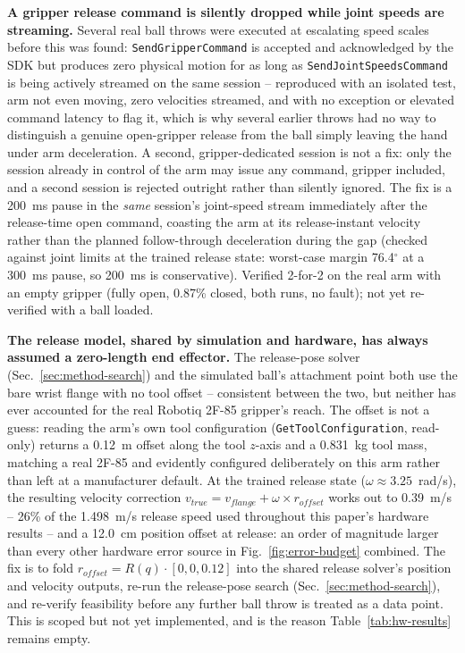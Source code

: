 \documentclass[conference]{IEEEtran}
\begin{document}
\textbf{A gripper release command is silently dropped while joint speeds
are streaming.} Several real ball throws were executed at escalating speed
scales before this was found: \texttt{SendGripperCommand} is accepted and
acknowledged by the SDK but produces zero physical motion for as long as
\texttt{SendJointSpeedsCommand} is being actively streamed on the same
session -- reproduced with an isolated test, arm not even moving, zero
velocities streamed, and with no exception or elevated command latency to
flag it, which is why several earlier throws had no way to distinguish a
genuine open-gripper release from the ball simply leaving the hand under
arm deceleration. A second, gripper-dedicated session is not a fix: only
the session already in control of the arm may issue any command, gripper
included, and a second session is rejected outright rather than silently
ignored. The fix is a 200~ms pause in the \emph{same} session's joint-speed
stream immediately after the release-time open command, coasting the arm at
its release-instant velocity rather than the planned follow-through
deceleration during the gap (checked against joint limits at the trained
release state: worst-case margin 76.4$^\circ$ at a 300~ms pause, so 200~ms
is conservative). Verified 2-for-2 on the real arm with an empty gripper
(fully open, 0.87\% closed, both runs, no fault); not yet re-verified with a
ball loaded.

\textbf{The release model, shared by simulation and hardware, has always
assumed a zero-length end effector.} The release-pose solver
(Sec.~\ref{sec:method-search}) and the simulated ball's attachment point
both use the bare wrist flange with no tool offset -- consistent between
the two, but neither has ever accounted for the real Robotiq 2F-85
gripper's reach. The offset is not a guess: reading the arm's own tool
configuration (\texttt{GetToolConfiguration}, read-only) returns a
0.12~m offset along the tool $z$-axis and a 0.831~kg tool mass, matching a
real 2F-85 and evidently configured deliberately on this arm rather than
left at a manufacturer default. At the trained release state
($\omega\approx3.25$~rad/s), the resulting velocity correction
$v_{true} = v_{flange} + \omega\times r_{offset}$ works out to 0.39~m/s --
26\% of the 1.498~m/s release speed used throughout this paper's hardware
results -- and a 12.0~cm position offset at release: an order of magnitude
larger than every other hardware error source in
Fig.~\ref{fig:error-budget} combined. The fix is to fold
$r_{offset} = R(q)\cdot[0,0,0.12]$ into the shared release solver's
position and velocity outputs, re-run the release-pose search
(Sec.~\ref{sec:method-search}), and re-verify feasibility before any
further ball throw is treated as a data point. This is scoped but not yet
implemented, and is the reason Table~\ref{tab:hw-results} remains empty.
\end{document}
